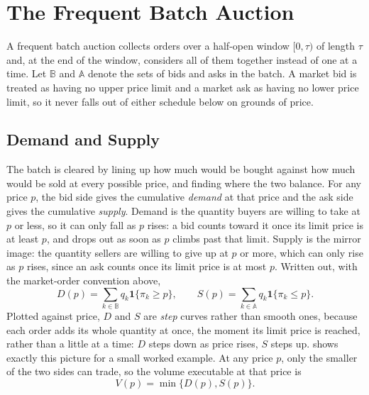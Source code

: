\section{The Frequent Batch Auction}
\label{sec:fbanotation}

A frequent batch auction collects orders over a half-open window $[0,\tau)$
of length $\tau$ and, at the end of the window, considers all of them
together instead of one at a time. Let $\mathbb{B}$ and $\mathbb{A}$
denote the sets of bids and asks in the batch. A market bid is treated as
having no upper price limit and a market ask as having no lower price
limit, so it never falls out of either schedule below on grounds of
price.

\subsection{Demand and Supply}

The batch is cleared by lining up how much would be bought against how much
would be sold at every possible price, and finding where the two balance.
For any price $p$, the bid side gives the cumulative \emph{demand} at that
price and the ask side gives the cumulative \emph{supply}.
Demand is the quantity buyers are willing to take at $p$ or less, so it can
only fall as $p$ rises: a bid counts toward it once its limit price is at
least $p$, and drops out as soon as $p$ climbs past that limit. Supply is
the mirror image: the quantity sellers are willing to give up at $p$ or
more, which can only rise as $p$ rises, since an ask counts once its limit
price is at most $p$. Written out, with the market-order convention above,
\begin{equation}
  \label{eq:demandsupply}
  D(p) = \sum_{k \in \mathbb{B}} q_k \mathbf{1}\{\pi_k \ge p\},
  \qquad
  S(p) = \sum_{k \in \mathbb{A}} q_k \mathbf{1}\{\pi_k \le p\}.
\end{equation}
Plotted against price, $D$ and $S$ are \emph{step} curves rather than
smooth ones, because each order adds its whole quantity at once, the
moment its limit price is reached, rather than a little at a time: $D$
steps down as price rises, $S$ steps up.  shows
exactly this picture for a small worked example. At any price $p$, only
the smaller of the two sides can trade, so the volume executable
at that price is
\begin{equation}
  V(p) = \min\{D(p), S(p)\}.
\end{equation}

